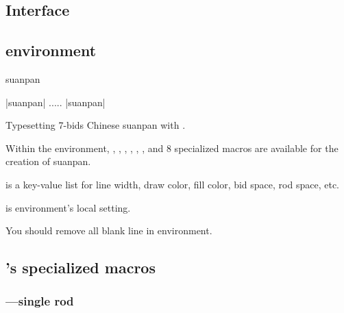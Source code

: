 \documentclass[full]{l3doc}
\begin{document}
\begin{documentation}
\section{Interface}

\subsection{ environment}

\begin{function}{suanpan}
  \begin{syntax}
    |{suanpan}|
    .....
    |{suanpan}|
  \end{syntax}
\end{function}

  Typesetting 7-bids Chinese suanpan with .

  Within the  environment, , , , ,
  , ,  and  8 specialized macros
  are available for the creation of suanpan.

   is a key-value list for line width, draw color, fill color,
  bid space, rod space, etc.

   is environment's local setting.

  \begin{noteen}
    You should remove all blank line in  environment.
  \end{noteen}

\begin{SideBySideExample}[frame=single,numbers=left,%
    xrightmargin=.48\linewidth,gobble=2]
  \centering
  \begin{suanpan}
  \end{suanpan}
\end{SideBySideExample}

\subsection{'s specialized macros}

\subsubsection{---single rod}

\begin{function}{\rod}
  \begin{syntax}
      
  \end{syntax}
\end{function}


\end{documentation}
\end{document}
